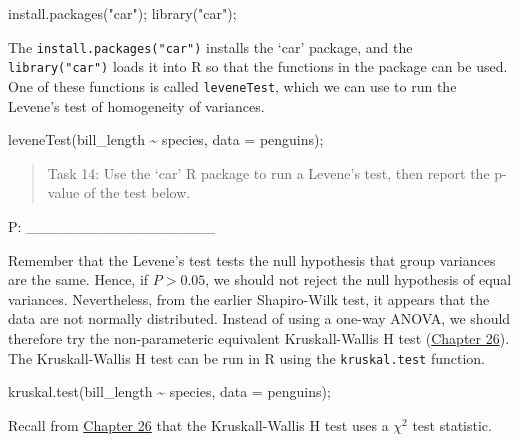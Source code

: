 \documentclass[
]{scrbook}
\newenvironment{Shaded}{\begin{snugshade}}{\end{snugshade}}
\newcommand{\AttributeTok}[1]{\textcolor[rgb]{0.77,0.63,0.00}{#1}}
\newcommand{\FunctionTok}[1]{\textcolor[rgb]{0.00,0.00,0.00}{#1}}
\newcommand{\NormalTok}[1]{#1}
\newcommand{\SpecialCharTok}[1]{\textcolor[rgb]{0.00,0.00,0.00}{#1}}
\newcommand{\StringTok}[1]{\textcolor[rgb]{0.31,0.60,0.02}{#1}}
\begin{document}
\begin{Shaded}
\begin{Highlighting}[]
\FunctionTok{install.packages}\NormalTok{(}\StringTok{"car"}\NormalTok{);}
\FunctionTok{library}\NormalTok{(}\StringTok{"car"}\NormalTok{);}
\end{Highlighting}
\end{Shaded}

The \texttt{install.packages("car")} installs the `car' package, and the \texttt{library("car")} loads it into R so that the functions in the package can be used.
One of these functions is called \texttt{leveneTest}, which we can use to run the Levene's test of homogeneity of variances.

\begin{Shaded}
\begin{Highlighting}[]
\FunctionTok{leveneTest}\NormalTok{(bill\_length }\SpecialCharTok{\textasciitilde{}}\NormalTok{ species, }\AttributeTok{data =}\NormalTok{ penguins);}
\end{Highlighting}
\end{Shaded}

\begin{quote}
Task 14: Use the `car' R package to run a Levene's test, then report the p-value of the test below.
\end{quote}

P: \_\_\_\_\_\_\_\_\_\_\_\_\_\_\_\_\_\_

Remember that the Levene's test tests the null hypothesis that group variances are the same.
Hence, if \(P > 0.05\), we should not reject the null hypothesis of equal variances.
Nevertheless, from the earlier Shapiro-Wilk test, it appears that the data are not normally distributed.
Instead of using a one-way ANOVA, we should therefore try the non-parameteric equivalent Kruskall-Wallis H test (\protect\hyperlink{Chapter_26}{Chapter 26}).
The Kruskall-Wallis H test can be run in R using the \texttt{kruskal.test} function.

\begin{Shaded}
\begin{Highlighting}[]
\FunctionTok{kruskal.test}\NormalTok{(bill\_length }\SpecialCharTok{\textasciitilde{}}\NormalTok{ species, }\AttributeTok{data =}\NormalTok{ penguins);}
\end{Highlighting}
\end{Shaded}

Recall from \protect\hyperlink{Chapter_26}{Chapter 26} that the Kruskall-Wallis H test uses a \(\chi^{2}\) test statistic.
\end{document}
